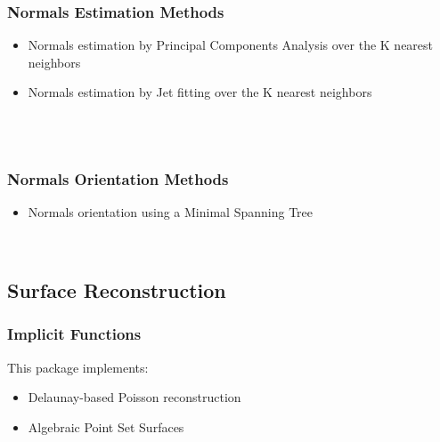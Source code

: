 \subsubsection{Normals Estimation Methods}

\begin{itemize}
\item Normals estimation by Principal Components Analysis over the K nearest neighbors
\item Normals estimation by Jet fitting over the K nearest neighbors
\end{itemize}

  \\
  \\


\subsubsection{Normals Orientation Methods}

\begin{itemize}
\item Normals orientation using a Minimal Spanning Tree \cite{cgal:hddms-srup-92}
\end{itemize}

  \\


\subsection{Surface Reconstruction}

\subsubsection{Implicit Functions}

This package implements:

\begin{itemize}
\item Delaunay-based Poisson reconstruction \cite{Kazhdan06}
\item Algebraic Point Set Surfaces \cite{Guennebaud07}
\end{itemize}

  \\
  \\


